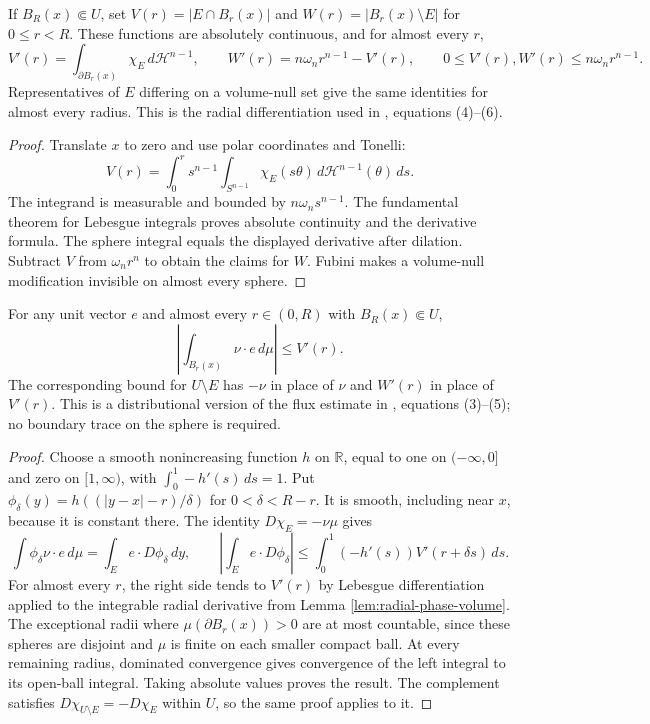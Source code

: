 \begin{lemma}\label{lem:radial-phase-volume}
If $B_R(x)\Subset U$, set $V(r)=|E\cap B_r(x)|$ and $W(r)=|B_r(x)\setminus E|$ for $0\leq r<R$. These functions are absolutely continuous, and for almost every $r$,
\[
 V'(r)=\int_{\partial B_r(x)}\chi_E\,d\mathcal H^{n-1},\qquad
 W'(r)=n\omega_n r^{n-1}-V'(r),
 \qquad 0\leq V'(r),W'(r)\leq n\omega_n r^{n-1}.
\]
Representatives of $E$ differing on a volume-null set give the same identities for almost every radius. This is the radial differentiation used in \cite{Sim18}, equations (4)--(6).
\end{lemma}
\begin{proof}
Translate $x$ to zero and use polar coordinates and Tonelli:
\[
 V(r)=\int_0^r s^{n-1}\int_{S^{n-1}}\chi_E(s\theta)\,d\mathcal H^{n-1}(\theta)\,ds.
\]
The integrand is measurable and bounded by $n\omega_n s^{n-1}$. The fundamental theorem for Lebesgue integrals proves absolute continuity and the derivative formula. The sphere integral equals the displayed derivative after dilation. Subtract $V$ from $\omega_n r^n$ to obtain the claims for $W$. Fubini makes a volume-null modification invisible on almost every sphere.
\end{proof}

\begin{lemma}\label{lem:perimeter-radial-flux}
For any unit vector $e$ and almost every $r\in(0,R)$ with $B_R(x)\Subset U$,
\[
 \left|\int_{B_r(x)}\nu\cdot e\,d\mu\right|\leq V'(r).
\]
The corresponding bound for $U\setminus E$ has $-\nu$ in place of $\nu$ and $W'(r)$ in place of $V'(r)$. This is a distributional version of the flux estimate in \cite{Sim18}, equations (3)--(5); no boundary trace on the sphere is required.
\end{lemma}
\begin{proof}
Choose a smooth nonincreasing function $h$ on $\mathbb R$, equal to one on $(-\infty,0]$ and zero on $[1,\infty)$, with $\int_0^1-h'(s)\,ds=1$. Put $\phi_\delta(y)=h((|y-x|-r)/\delta)$ for $0<\delta<R-r$. It is smooth, including near $x$, because it is constant there. The identity $D\chi_E=-\nu\mu$ gives
\[
 \int\phi_\delta\nu\cdot e\,d\mu
 =\int_E e\cdot D\phi_\delta\,dy,
 \qquad
 \left|\int_E e\cdot D\phi_\delta\right|
 \leq\int_0^1(-h'(s))V'(r+\delta s)\,ds.
\]
For almost every $r$, the right side tends to $V'(r)$ by Lebesgue differentiation applied to the integrable radial derivative from Lemma \ref{lem:radial-phase-volume}. The exceptional radii where $\mu(\partial B_r(x))>0$ are at most countable, since these spheres are disjoint and $\mu$ is finite on each smaller compact ball. At every remaining radius, dominated convergence gives convergence of the left integral to its open-ball integral. Taking absolute values proves the result. The complement satisfies $D\chi_{U\setminus E}=-D\chi_E$ within $U$, so the same proof applies to it.
\end{proof}

